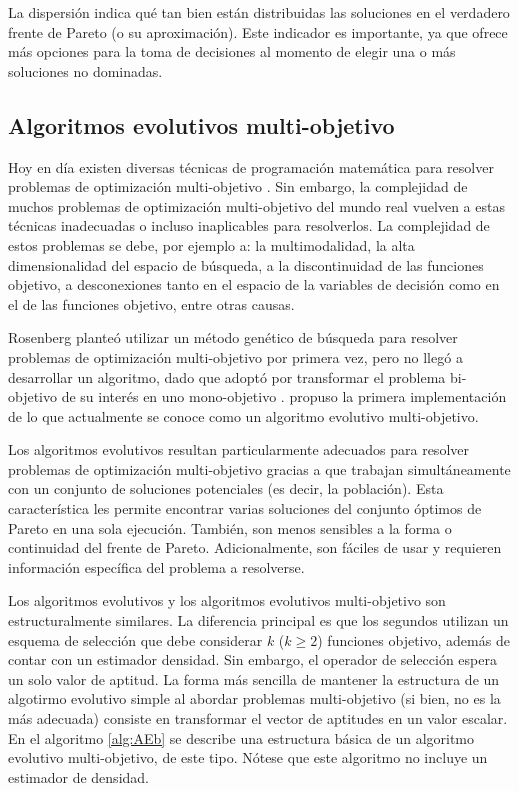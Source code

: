       La dispersi\'on indica qu\'e tan bien est\'an distribuidas las soluciones en el verdadero frente de Pareto (o su aproximaci\'on).
      Este indicador es importante, ya que ofrece m\'as opciones para la toma de decisiones al momento de elegir una o m\'as soluciones 
      no dominadas.
  
  \subsection{Algoritmos evolutivos multi-objetivo}

  Hoy en d\'ia existen diversas t\'ecnicas de programaci\'on matem\'atica para resolver problemas de optimizaci\'on multi-objetivo 
  \cite{Miettinen98, EASMC85}. Sin embargo, la complejidad de muchos problemas de optimizaci\'on multi-objetivo del mundo real vuelven 
  a estas t\'ecnicas inadecuadas o incluso inaplicables para resolverlos. La complejidad de estos problemas se debe, por ejemplo a: 
  la multimodalidad, la alta dimensionalidad del espacio de b\'usqueda, a la discontinuidad de las funciones objetivo, a desconexiones 
  tanto en el espacio de la variables de decisi\'on como en el de las funciones objetivo, entre otras causas.

  Rosenberg plante\'o utilizar un m\'etodo gen\'etico de b\'usqueda para resolver problemas de optimizaci\'on
  multi-objetivo por primera vez, pero no lleg\'o a desarrollar un algoritmo, dado que adopt\'o por transformar el problema 
  bi-objetivo de su inter\'es en uno mono-objetivo \cite{Rosenberg67}. \cite{Schaffer84} propuso la primera implementaci\'on de lo que 
  actualmente se conoce como un algoritmo evolutivo multi-objetivo. 

  Los algoritmos evolutivos resultan particularmente adecuados para resolver problemas de optimizaci\'on multi-objetivo gracias a que
  trabajan simult\'aneamente con un conjunto de soluciones potenciales (es decir, la poblaci\'on). Esta caracter\'istica les permite 
  encontrar varias soluciones del conjunto \'optimos de Pareto en una sola ejecuci\'on. Tambi\'en, son menos sensibles a la forma o 
  continuidad del frente de Pareto. Adicionalmente, son f\'aciles de usar y requieren informaci\'on espec\'ifica del problema a resolverse.

  Los algoritmos evolutivos y los algoritmos evolutivos multi-objetivo son estructuralmente similares. La diferencia principal es que 
  los segundos utilizan un esquema de selecci\'on que debe considerar $k$ ($k \geq 2$) funciones objetivo, adem\'as de contar
  con un estimador densidad. Sin embargo, el operador de selecci\'on espera un solo valor de aptitud. La forma m\'as sencilla de mantener 
  la estructura de un algotirmo evolutivo simple al abordar problemas multi-objetivo (si bien, no es la m\'as adecuada) consiste en 
  transformar el vector de aptitudes en un valor escalar. En el algoritmo \ref{alg:AEb} se describe una estructura b\'asica de un 
  algoritmo evolutivo multi-objetivo, de este tipo. N\'otese que este algoritmo no incluye un estimador de densidad.
  
